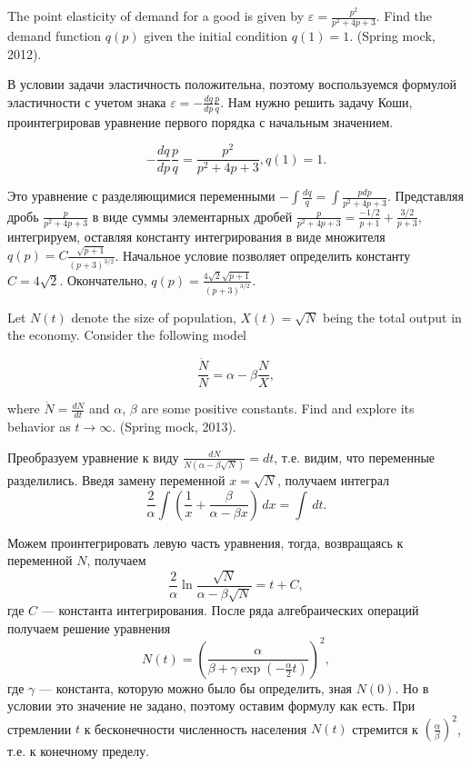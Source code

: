 
\begin{problem}
The point elasticity of demand for a good is given by $\varepsilon =\frac{p^{2} }{p^{2} +4p+3} $. Find the demand function $q(p)$ given the initial condition $q(1)=1$. (Spring mock, 2012).
\end{problem}


\begin{solution}
В условии задачи эластичность положительна, поэтому воспользуемся формулой эластичности с учетом знака $\varepsilon =-\frac{dq}{dp} \frac{p}{q} $. Нам нужно решить задачу Коши, проинтегрировав уравнение первого порядка с начальным значением.

\[-\frac{dq}{dp} \frac{p}{q} =\frac{p^{2} }{p^{2} +4p+3} , q(1)=1.\] 

Это уравнение с разделяющимися переменными $-\int \frac{dq}{q} =\int \frac{pdp}{p^{2} +4p+3}   $. Представляя дробь $\frac{p}{p^{2} +4p+3} $ в виде суммы элементарных дробей $\frac{p}{p^{2} +4p+3} =\frac{-1/2}{p+1} +\frac{3/2}{p+3} $, интегрируем, оставляя константу интегрирования в виде множителя $q(p)=C\frac{\sqrt{p+1} }{(p+3)^{3/2} } $. Начальное условие позволяет определить константу $C=4\sqrt{2} $. Окончательно, $q(p)=\frac{4\sqrt{2} \sqrt{p+1} }{(p+3)^{3/2} } $.
\end{solution}





\begin{problem}
Let $N(t)$ denote the size of population, $X(t)=\sqrt{N} $ being the total output in the economy. Consider the following model

\[\frac{\dot{N}}{N} =\alpha -\beta \frac{N}{X} ,\] 

where $\dot{N}=\frac{dN}{dt} $ and $\alpha$, $\beta$ are some positive constants. Find  and explore its behavior as $t\to \infty $. (Spring mock, 2013).
\end{problem}


\begin{solution}
Преобразуем уравнение к виду $\frac{dN}{N(\alpha -\beta \sqrt{N} )} =dt$, т.е. видим, что переменные разделились. Введя замену переменной $x=\sqrt{N} $, получаем интеграл
\[
\frac{2}{\alpha} \int \left( \frac{1}{x} + \frac{\beta}{\alpha - \beta x} \right) \, dx = \int \, dt.
\]

Можем проинтегрировать левую часть уравнения, тогда, возвращаясь к переменной $N$, получаем
\[
\frac{2}{\alpha } \ln \frac{\sqrt{N} }{\alpha -\beta \sqrt{N} } =t+C,
\]
где $C$ --- константа интегрирования. После ряда алгебраических операций получаем решение уравнения 
\[
N(t)=\left(\frac{\alpha }{\beta +\gamma \exp (-\frac{\alpha }{2} t)} \right)^{2},
\]
где $\gamma$ --- константа, которую можно было бы определить, зная $N(0)$. Но в условии это значение не задано, поэтому оставим формулу как есть. При стремлении $t$ к бесконечности численность населения $N(t)$ стремится к $\left(\frac{\alpha }{\beta } \right)^{2} $, т.е. к конечному пределу.
\end{solution}


